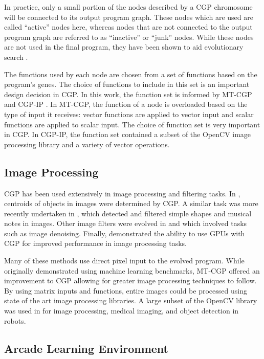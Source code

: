 \documentclass[sigconf,screen]{acmart}\settopmatter{printfolios=true,printacmref=false}
\begin{document}
In practice, only a small portion of the nodes described by a CGP chromosome
will be connected to its output program graph. These nodes which are used are
called ``active'' nodes here, whereas nodes that are not connected to the output
program graph are referred to as ``inactive'' or ``junk'' nodes. While these
nodes are not used in the final program, they have been shown to aid
evolutionary search \cite{Miller2006, Vassilev2000, Yu2001}.

The functions used by each node are chosen from a set of functions based on the
program's genes. The choice of functions to include in this set is an important
design decision in CGP. In this work, the function set is informed by MT-CGP
\cite{Harding2012} and CGP-IP \cite{Harding2013}. In MT-CGP, the function of a
node is overloaded based on the type of input it receives: vector functions are
applied to vector input and scalar functions are applied to scalar input. The
choice of function set is very important in CGP. In CGP-IP, the function set
contained a subset of the OpenCV image processing library and a variety of
vector operations.
 \subsection{Image Processing}
\label{sec:image_proc}

CGP has been used extensively in image processing and filtering tasks. In
\citet{Montes2003}, centroids of objects in images were determined by CGP. A
similar task was more recently undertaken in \citet{Paris2015}, which detected
and filtered simple shapes and musical notes in images. Other image filters were
evolved in \citet{Smith2005} and \citet{Sekanina2011} which involved tasks such as
image denoising. Finally, \citet{Harding2008} demonstrated the ability to use
GPUs with CGP for improved performance in image processing tasks.

Many of these methods use direct pixel input to the evolved program. While
originally demonstrated using machine learning benchmarks, MT-CGP
\citep{Harding2012} offered an improvement to CGP allowing for greater image
processing techniques to follow. By using matrix inputs and functions, entire
images could be processed using state of the art image processing libraries. A
large subset of the OpenCV library was used in \citet{Harding2013} for image
processing, medical imaging, and object detection in robots.

\subsection{Arcade Learning Environment}
\label{sec:ale}
\end{document}
